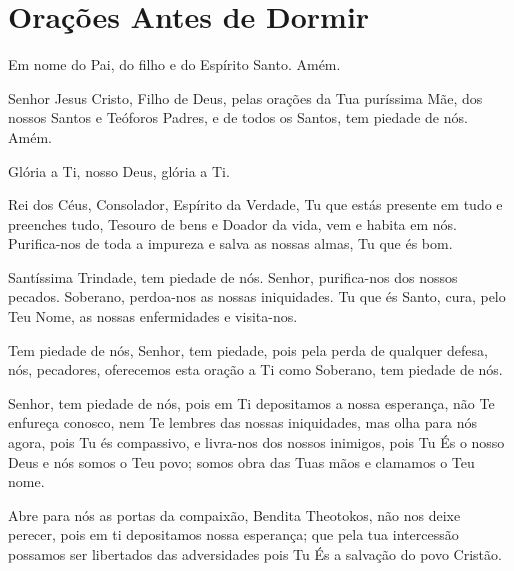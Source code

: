 \documentclass{subfiles}
\begin{document}
\chapter{Orações Antes de Dormir}

Em nome do Pai, do filho e do Espírito Santo. Amém. 
 
Senhor Jesus Cristo, Filho de Deus, pelas orações da Tua puríssima 
Mãe, dos nossos Santos e Teóforos Padres, e de todos os Santos, tem piedade 
de nós. Amém. 
 
Glória a Ti, nosso Deus, glória a Ti. 
 
Rei dos Céus, Consolador, Espírito da Verdade, Tu que estás presente 
em tudo e preenches tudo, Tesouro de bens e Doador da vida, vem e habita 
em nós. Purifica-nos de toda a impureza e salva as nossas almas, Tu que és 
bom. 
 
\trisagion{} \thrice{}

\Doxology{}
 
Santíssima Trindade, tem piedade de nós. Senhor, purifica-nos dos 
nossos pecados. Soberano, perdoa-nos as nossas iniquidades. Tu que és Santo, 
cura, pelo Teu Nome, as nossas enfermidades e visita-nos. 
 
\mercy{} \thrice{}
 
\Doxology{}
 
\ourFather{}


Tem piedade de nós, Senhor, tem piedade, pois pela perda de qualquer defesa,
nós, pecadores, oferecemos esta oração a Ti como Soberano, tem piedade de nós. 
 
\doxology{}

Senhor, tem piedade de nós, pois em Ti depositamos a nossa esperança, não Te
enfureça conosco, nem Te lembres das nossas iniquidades, mas olha para nós
agora, pois Tu és compassivo, e livra-nos dos nossos inimigos, pois Tu És o
nosso Deus e nós somos o Teu povo; somos obra das Tuas mãos e clamamos o Teu
nome. 
 
\nowandever{}

Abre para nós as portas da compaixão, Bendita Theotokos, não nos deixe perecer,
pois em ti depositamos nossa esperança; que pela tua intercessão possamos ser
libertados das adversidades pois Tu És a salvação do povo Cristão.

\mercy{} 

 
\end{document}

